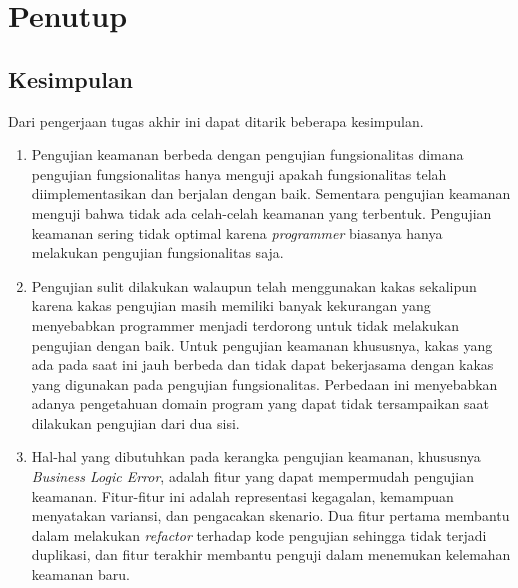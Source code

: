 \chapter{Penutup}

\section{Kesimpulan}



Dari pengerjaan tugas akhir ini dapat ditarik beberapa kesimpulan.

\begin{enumerate}
      \item Pengujian keamanan berbeda dengan pengujian fungsionalitas dimana pengujian fungsionalitas hanya menguji apakah fungsionalitas
            telah diimplementasikan dan berjalan dengan baik. Sementara pengujian keamanan menguji bahwa tidak ada celah-celah keamanan
            yang terbentuk. Pengujian keamanan sering tidak optimal karena \textit{programmer} biasanya hanya melakukan pengujian
            fungsionalitas saja.

      \item Pengujian sulit dilakukan walaupun telah menggunakan kakas sekalipun karena kakas pengujian masih memiliki banyak kekurangan
            yang menyebabkan programmer menjadi terdorong untuk tidak melakukan pengujian dengan baik. Untuk pengujian
            keamanan khususnya, kakas yang ada pada saat ini jauh berbeda dan tidak dapat bekerjasama dengan kakas
            yang digunakan pada pengujian fungsionalitas. Perbedaan ini menyebabkan adanya pengetahuan domain program
            yang dapat tidak tersampaikan saat dilakukan pengujian dari dua sisi.

      \item Hal-hal yang dibutuhkan pada kerangka pengujian keamanan, khususnya \textit{Business Logic Error}, adalah fitur
            yang dapat mempermudah pengujian keamanan. Fitur-fitur ini adalah representasi kegagalan, kemampuan menyatakan variansi,
            dan pengacakan skenario. Dua fitur pertama membantu dalam melakukan \textit{refactor} terhadap kode pengujian sehingga
            tidak terjadi duplikasi, dan fitur terakhir membantu penguji dalam menemukan kelemahan keamanan baru.
\end{enumerate}

